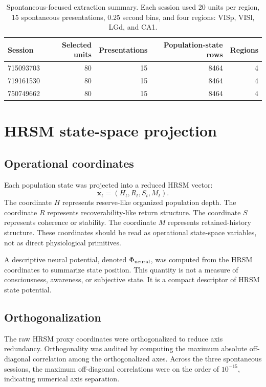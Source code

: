 \documentclass[11pt]{article}
\begin{document}
\begin{table}[t]
\centering
\caption{Spontaneous-focused extraction summary. Each session used 20 units per region, 15 spontaneous presentations, 0.25 second bins, and four regions: VISp, VISl, LGd, and CA1.}
\label{tab:extraction-summary}
\begin{tabular}{lrrrr}
\toprule
Session & Selected units & Presentations & Population-state rows & Regions \\
\midrule
715093703 & 80 & 15 & 8464 & 4 \\
719161530 & 80 & 15 & 8464 & 4 \\
750749662 & 80 & 15 & 8464 & 4 \\
\bottomrule
\end{tabular}
\end{table}

\section{HRSM state-space projection}

\subsection{Operational coordinates}

Each population state was projected into a reduced HRSM vector:
\[
\mathbf{x}_{t} = (H_t, R_t, S_t, M_t).
\]
The coordinate \(H\) represents reserve-like organized population depth. The coordinate \(R\) represents recoverability-like return structure. The coordinate \(S\) represents coherence or stability. The coordinate \(M\) represents retained-history structure. These coordinates should be read as operational state-space variables, not as direct physiological primitives.

A descriptive neural potential, denoted \(\Phi_{\rm neural}\), was computed from the HRSM coordinates to summarize state position. This quantity is not a measure of consciousness, awareness, or subjective state. It is a compact descriptor of HRSM state potential.

\subsection{Orthogonalization}

The raw HRSM proxy coordinates were orthogonalized to reduce axis redundancy. Orthogonality was audited by computing the maximum absolute off-diagonal correlation among the orthogonalized axes. Across the three spontaneous sessions, the maximum off-diagonal correlations were on the order of \(10^{-15}\), indicating numerical axis separation.
\end{document}
